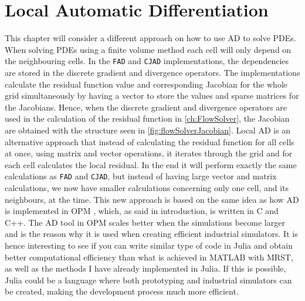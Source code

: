 \chapter{Local Automatic Differentiation}
\label{ch:LocalAD}
This chapter will consider a different approach on how to use AD to solve PDEs. When solving PDEs using a finite volume method each cell will only depend on the neighbouring cells. In the \texttt{FAD} and \texttt{CJAD} implementations, the dependencies are stored in the discrete gradient and divergence operators. The implementations calculate the residual function value and corresponding Jacobian for the whole grid simultaneously by having a vector to store the values and sparse matrices for the Jacobians. Hence, when the discrete gradient and divergence operators are used in the calculation of the residual function in \autoref{ch:FlowSolver}, the Jacobian are obtained with the structure seen in \autoref{fig:flowSolverJacobian}. Local AD is an alternative approach that instead of calculating the residual function for all cells at once, using matrix and vector operations, it iterates through the grid and for each cell calculates the local residual. In the end it will perform exactly the same calculations as \texttt{FAD} and \texttt{CJAD}, but instead of having large vector and matrix calculations, we now have smaller calculations concerning only one cell, and its neighbours, at the time. This new approach is based on the same idea as how AD is implemented in OPM \emph{\citep{OPM}}, which, as said in introduction, is written in C and C++. The AD tool in OPM scales better when the simulations become larger and is the reason why it is used when creating efficient industrial simulators. It is hence interesting to see if you can write similar type of code in Julia and obtain better computational efficiency than what is achieved in MATLAB with MRST, as well as the methods I have already implemented in Julia. If this is possible, Julia could be a language where both prototyping and industrial simulators can be created, making the development process much more efficient. 

